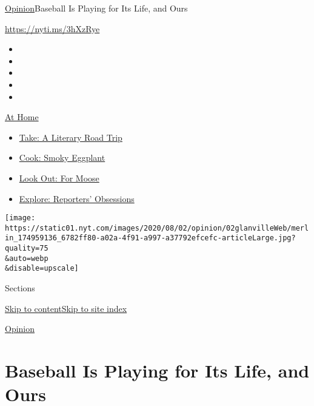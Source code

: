 \href{/section/opinion}{Opinion}\textbar{}Baseball Is Playing for Its
Life, and Ours

\url{https://nyti.ms/3hXzRye}

\begin{itemize}
\item
\item
\item
\item
\item
\end{itemize}

\href{https://www.nytimes.com/spotlight/at-home?action=click\&pgtype=Article\&state=default\&region=TOP_BANNER\&context=at_home_menu}{At
Home}

\begin{itemize}
\tightlist
\item
  \href{https://www.nytimes.com/2020/07/28/books/time-for-a-literary-road-trip.html?action=click\&pgtype=Article\&state=default\&region=TOP_BANNER\&context=at_home_menu}{Take:
  A Literary Road Trip}
\item
  \href{https://www.nytimes.com/2020/07/29/magazine/bored-with-your-home-cooking-some-smoky-eggplant-will-fix-that.html?action=click\&pgtype=Article\&state=default\&region=TOP_BANNER\&context=at_home_menu}{Cook:
  Smoky Eggplant}
\item
  \href{https://www.nytimes.com/2020/07/27/travel/moose-michigan-isle-royale.html?action=click\&pgtype=Article\&state=default\&region=TOP_BANNER\&context=at_home_menu}{Look
  Out: For Moose}
\item
  \href{https://www.nytimes.com/interactive/2020/at-home/even-more-reporters-editors-diaries-lists-recommendations.html?action=click\&pgtype=Article\&state=default\&region=TOP_BANNER\&context=at_home_menu}{Explore:
  Reporters' Obsessions}
\end{itemize}

\texttt{[image: https://static01.nyt.com/images/2020/08/02/opinion/02glanvilleWeb/merlin\_174959136\_6782ff80-a02a-4f91-a997-a37792efcefc-articleLarge.jpg?quality=75\\\&auto=webp\\\&disable=upscale]}

Sections

\protect\hyperlink{site-content}{Skip to
content}\protect\hyperlink{site-index}{Skip to site index}

\href{/section/opinion}{Opinion}

\hypertarget{baseball-is-playing-for-its-life-and-ours}{%
\section{Baseball Is Playing for Its Life, and
Ours}\label{baseball-is-playing-for-its-life-and-ours}}

